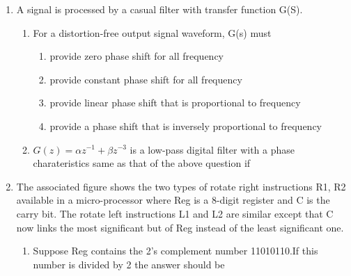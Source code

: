 \documentclass[journal,12pt,onecolumn]{IEEEtran}
\theoremstyle{remark}
\begin{document}
\begin{enumerate}
\begin{enumerate}
\begin{enumerate}
		\end{enumerate}
\end{enumerate}
	\item A signal is processed by a casual filter with transfer function G(S).
\begin{enumerate}
	\item For a distortion-free output signal waveform, G(s) must
		\begin{enumerate}
			\item provide zero phase shift for all frequency
			\item provide constant phase shift for all frequency
			\item provide linear phase shift that is proportional to frequency
			\item provide a phase shift that is inversely proportional to frequency
		\end{enumerate}
	\item $ G(z) = \alpha z^{-1} + \beta z^{-3}$ is a low-pass digital filter with a phase charateristics same as that of the above question if
		\begin{enumerate}
		\end{enumerate}
\end{enumerate}
	\item The associated figure shows the two types of rotate right instructions R1, R2 available in a micro-processor where Reg is a 8-digit register and C is the carry bit. The rotate left instructions L1 and L2 are similar except that C now links the most significant but of Reg instead of the least significant one.
	\begin{enumerate}
		\item Suppose Reg contains the 2's complement number 11010110.If this number is divided by 2 the answer should be
			\begin{enumerate}

\end{enumerate}
\end{enumerate}
\end{enumerate}
\end{document}
